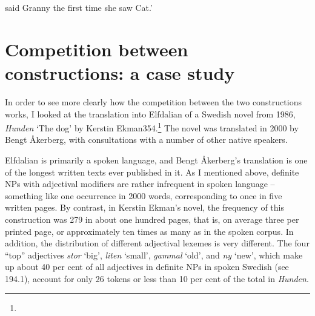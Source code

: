 \begin{styleTranslation}
 said Granny the first time she saw Cat.’

\end{styleTranslation}

\section{\rmfamily\bfseries Competition between constructions: a case study}

\begin{styleBodyTextFirst}
In order to see more clearly how the competition between the two constructions works, I looked at the translation into Elfdalian of a Swedish novel from 1986, \textit{Hunden} ‘The dog’ by Kerstin Ekman354.\footnote{} The novel was translated in 2000 by Bengt Åkerberg, with consultations with a number of other native speakers. 

\end{styleBodyTextFirst}

\begin{styleBodytextC}
Elfdalian is primarily a spoken language, and Bengt Åkerberg’s translation is one of the longest written texts ever published in it. As I mentioned above, definite NPs with adjectival modifiers are rather infrequent in spoken language – something like one occurrence in 2000 words, corresponding to once in five written pages. By contrast, in Kerstin Ekman’s novel, the frequency of this construction was 279 in about one hundred pages, that is, on average three per printed page, or approximately ten times as many as in the spoken corpus. In addition, the distribution of different adjectival lexemes is very different. The four “top” adjectives \textit{stor }‘big’, \textit{liten} ‘small’, \textit{gammal} ‘old’, and \textit{ny} ‘new’, which make up about 40 per cent of all adjectives in definite NPs in spoken Swedish (see 194.1), account for only 26 tokens or less than 10 per cent of the total in \textit{Hunden}.

\end{styleBodytextC}

